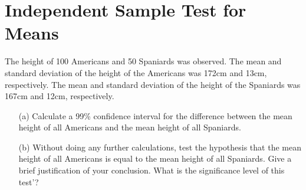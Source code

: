\documentclass[]{report}
\begin{document}
\section*{Independent Sample Test for Means} 

\large 	
\noindent The height of 100 Americans and 50 Spaniards was observed. The mean and
	standard deviation of the height of the Americans was 172cm and 13cm,
	respectively. The mean and standard deviation of the height of the Spaniards
	was 167cm and 12cm, respectively.
	
	\begin{itemize}
		\item[(a)] Calculate a 99\% confidence interval for the difference between the mean height
		of all Americans and the mean height of all Spaniards.
		
		
		\item[(b)] Without doing any further calculations, test the hypothesis that the mean
		height of all Americans is equal to the mean height of all Spaniards. Give a brief
		justification of your conclusion. What is the significance level of this test'?
	\end{itemize}
\end{document}
